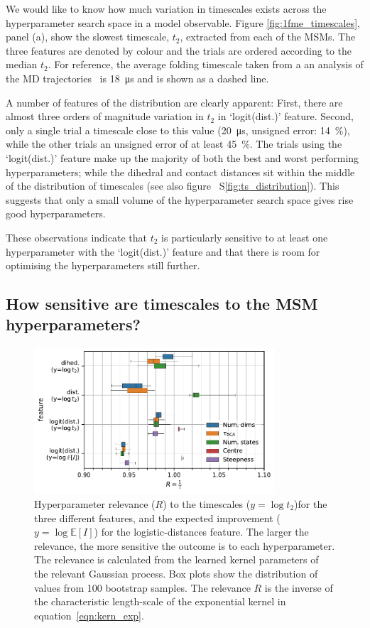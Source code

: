 \documentclass[journal=jacsat,manuscript=article]{achemso}
\newcommand*\sref[1]{%
    S\ref{#1}}
\begin{document}
We would like to know how much variation in timescales exists across the hyperparameter search space in a model observable. Figure \ref{fig:1fme_timescales}, panel (a), show the slowest timescale, $t_2$, extracted from each of the MSMs. The three features are denoted by colour and the trials are ordered according to the median $t_2$. For reference, the average folding timescale taken from a an analysis of the MD trajectories~\cite{lindorff-larsen_how_2011} is \SI{18}{\micro\second} and is shown as a dashed line.  

A number of features of the distribution are clearly apparent: First, there are almost three orders of magnitude variation in $t_2$ in `logit(dist.)' feature. Second, only a single trial  a timescale close to this value (\SI{20}{\micro\second}, unsigned error: \SI{14}{\percent}), while the other trials an unsigned error of  at least \SI{45}{\percent}. The trials using the `logit(dist.)' feature make up the majority of both the best and worst performing hyperparameters; while the dihedral and contact distances sit within the middle of the distribution of timescales (see also figure~\sref{fig:ts_distribution}). This suggests that only a small volume of the hyperparameter search space gives rise good hyperparameters.  

These observations indicate that $t_2$ is particularly sensitive to at least one hyperparameter with the `logit(dist.)' feature and that there is room for optimising the hyperparameters still further. 

\subsection{How sensitive are timescales to the MSM hyperparameters?}\label{sec:sensitivity}

\begin{figure}
    \centering
    \includegraphics[width=0.8\textwidth]{figures/sensitivity.pdf}
    \caption{Hyperparameter relevance ($R$) to the timescales ($y=\log{t_{2}}$)for the three different features,  and the expected improvement ($y=\log{\mathbb{E}[I]}$) for the logistic-distances feature. The larger the relevance, the more sensitive the outcome is to each hyperparameter.  The relevance is calculated from the learned kernel parameters of the relevant Gaussian process. Box plots show the distribution of values from \num{100} bootstrap samples. The relevance $R$ is the inverse of the characteristic length-scale of the exponential kernel in equation~\ref{eqn:kern_exp}. }
    \label{fig:sensitivity}
\end{figure}
\end{document}
